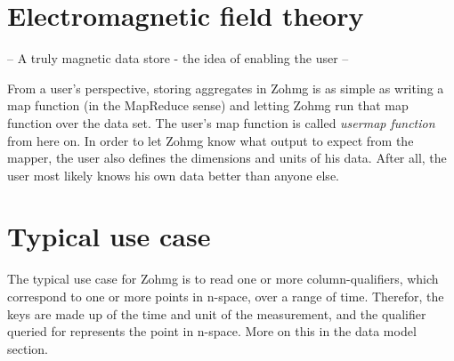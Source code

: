 \section{Electromagnetic field theory}

-- A truly magnetic data store - the idea of enabling the user --

From a user's perspective, storing aggregates in Zohmg is as simple as writing
a map function (in the MapReduce sense) and letting Zohmg run that map function
over the data set. The user's map function is called \textit{usermap function}
from here on. In order to let Zohmg know what output to expect from the mapper,
the user also defines the dimensions and units of his data. After all, the user
most likely knows his own data better than anyone else.


\section{Typical use case}

The typical use case for Zohmg is to read one or more column-qualifiers,
which correspond to one or more points in n-space, over a range of time.
Therefor, the keys are made up of the time and unit of the measurement,
and the qualifier queried for represents the point in n-space. More on
this in the data model section.




